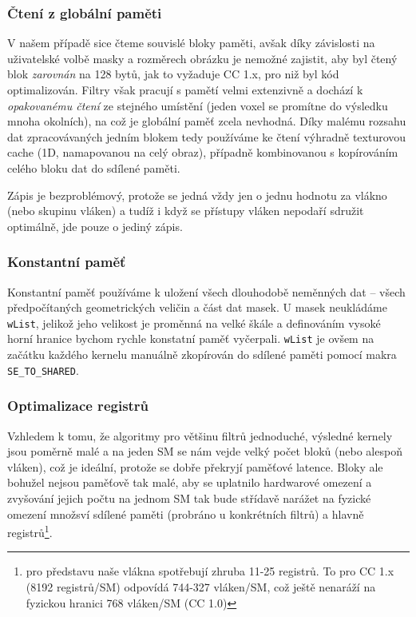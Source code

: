         \subsubsection{Čtení z globální paměti}\label{globální pam opt}

        V našem případě sice čteme souvislé bloky paměti, avšak díky závislosti na uživatelské volbě masky a rozměrech obrázku je nemožné zajistit, aby byl čtený blok \emph{zarovnán} na 128 bytů, jak to vyžaduje CC 1.x, pro niž byl kód optimalizován. Filtry však pracují s pamětí velmi extenzivně a dochází k \emph{opakovanému čtení} ze stejného umístění (jeden voxel se promítne do výsledku mnoha okolních), na což je globální paměť zcela nevhodná. Díky malému rozsahu dat zpracovávaných jedním blokem tedy používáme ke čtení výhradně texturovou cache (1D, namapovanou na celý obraz), případně kombinovanou s kopírováním celého bloku dat do sdílené paměti.

        Zápis je bezproblémový, protože se jedná vždy jen o jednu hodnotu za vlákno (nebo skupinu vláken) a tudíž i když se přístupy vláken nepodaří sdružit optimálně, jde pouze o jediný zápis.

        \subsubsection{Konstantní paměť}

        Konstantní paměť používáme k uložení všech dlouhodobě neměnných dat -- všech předpočítaných geometrických veličin a část dat masek. U masek neukládáme {\tt wList}, jelikož jeho velikost je proměnná na velké škále a definováním vysoké horní hranice bychom rychle konstatní paměť vyčerpali. {\tt wList} je ovšem na začátku každého kernelu manuálně zkopírován do sdílené paměti pomocí makra {\tt SE\_TO\_SHARED}.

        \subsubsection{Optimalizace registrů}

        Vzhledem k tomu, že algoritmy pro většinu filtrů jednoduché, výsledné kernely jsou poměrně malé a na jeden SM se nám vejde velký počet bloků (nebo alespoň vláken), což je ideální, protože se dobře překryjí paměťové latence. Bloky ale bohužel nejsou paměťově tak malé, aby se uplatnilo hardwarové omezení a zvyšování jejich počtu na jednom SM tak bude střídavě narážet na fyzické omezení množsví sdílené paměti (probráno u konkrétních filtrů) a hlavně registrů\footnote{pro představu naše vlákna spotřebují zhruba 11-25 registrů. To pro CC 1.x (8192 registrů/SM) odpovídá 744-327 vláken/SM, což ještě nenaráží na fyzickou hranici 768 vláken/SM (CC 1.0)}.

